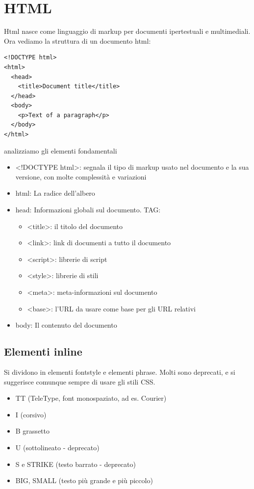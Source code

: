 \documentclass[a4paper,12pt]{article}
\begin{document}
\section{HTML}
Html nasce come linguaggio di markup per documenti ipertestuali e multimediali. Ora vediamo la struttura di un documento html:
\begin{lstlisting}
<!DOCTYPE html>
<html>
  <head>
    <title>Document title</title>
  </head>
  <body>
    <p>Text of a paragraph</p>
  </body>
</html>
\end{lstlisting}
analizziamo gli elementi fondamentali
\begin{itemize}
  \item <!DOCTYPE html>: segnala il tipo di markup usato nel documento e la sua versione, con molte complessità e variazioni
  \item html: La radice dell'albero
  \item head: Informazioni globali sul documento. TAG:
  \begin{itemize}
    \item <title>: il titolo del documento
    \item <link>: link di documenti a tutto il documento
    \item <script>: librerie di script
    \item <style>: librerie di stili
    \item <meta>: meta-informazioni sul documento
    \item <base>: l’URL da usare come base per gli URL relativi
  \end{itemize}
  \item body: Il contenuto del documento
\end{itemize}
\subsection*{Elementi inline}
Si dividono in elementi fontstyle e elementi phrase. Molti sono deprecati, e si suggerisce comunque sempre di usare gli stili CSS.
\begin{itemize}
  \item TT (TeleType, font monospaziato, ad es. Courier)
  \item I (corsivo)
  \item B grassetto
  \item U (sottolineato - deprecato)
  \item S e STRIKE (testo barrato - deprecato)
  \item BIG, SMALL (testo più grande e più piccolo)
\end{itemize}
\end{document}

